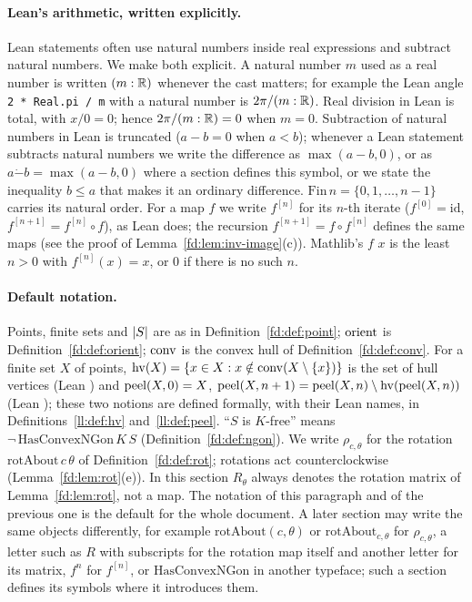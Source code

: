\paragraph{Lean's arithmetic, written explicitly.}
Lean statements often use natural numbers inside real expressions and subtract natural numbers. We make
both explicit. A natural number $m$ used as a real number is written $(m:\mathbb R)$ whenever the cast matters;
for example the Lean angle \texttt{2 * Real.pi / m} with  a natural number is $2\pi/(m:\mathbb R)$. Real
division in Lean is total, with $x/0=0$; hence $2\pi/(m:\mathbb R)=0$ when $m=0$. Subtraction of natural
numbers in Lean is truncated ($a-b=0$ when $a<b$); whenever a Lean statement subtracts natural numbers we
write the difference as $\max(a-b,0)$, or as $a\mathbin{\dot-}b=\max(a-b,0)$ where a section defines this
symbol, or we state the inequality $b\le a$ that makes it an ordinary difference.
$\mathrm{Fin}\,n=\{0,1,\dots,n-1\}$ carries its natural order. For a map $f$ we write $f^{[n]}$ for its
$n$-th iterate ($f^{[0]}=\mathrm{id}$, $f^{[n+1]}=f^{[n]}\circ f$), as Lean does; the recursion
$f^{[n+1]}=f\circ f^{[n]}$ defines the same maps (see the proof of Lemma~\ref{fd:lem:inv-image}(c)).
Mathlib's  $f$ $x$ is the least $n>0$ with $f^{[n]}(x)=x$, or $0$ if there
is no such $n$.

\paragraph{Default notation.}
Points, finite sets and $\lvert S\rvert$ are as in Definition~\ref{fd:def:point}; $\operatorname{orient}$ is
Definition~\ref{fd:def:orient}; $\operatorname{conv}$ is the convex hull of Definition~\ref{fd:def:conv}. For a finite
set $X$ of points, $\operatorname{hv}(X)=\{x\in X: x\notin\operatorname{conv}(X\setminus\{x\})\}$ is the set of hull vertices
(Lean ) and $\operatorname{peel}(X,0)=X$, $\operatorname{peel}(X,n+1)=\operatorname{peel}(X,n)\setminus\operatorname{hv}(\operatorname{peel}(X,n))$
(Lean ); these two notions are defined formally, with their Lean names, in
Definitions~\ref{ll:def:hv} and~\ref{ll:def:peel}. ``$S$ is $K$-free'' means
$\neg\,\mathrm{HasConvexNGon}\,K\,S$ (Definition~\ref{fd:def:ngon}). We write $\rho_{c,\theta}$ for the
rotation $\mathrm{rotAbout}\,c\,\theta$ of Definition~\ref{fd:def:rot}; rotations act counterclockwise
(Lemma~\ref{fd:lem:rot}(e)). In this section $R_\theta$ always denotes the rotation matrix of
Lemma~\ref{fd:lem:rot}, not a map. The notation of this paragraph and of the previous one is the
default for the whole document. A later section may write the same objects differently, for example
$\mathrm{rotAbout}(c,\theta)$ or $\mathrm{rotAbout}_{c,\theta}$ for $\rho_{c,\theta}$, a letter such as
$R$ with subscripts for the rotation map itself and another letter for its matrix, $f^n$ for $f^{[n]}$,
or $\mathrm{HasConvexNGon}$ in another typeface; such a section defines its symbols where it introduces
them.

